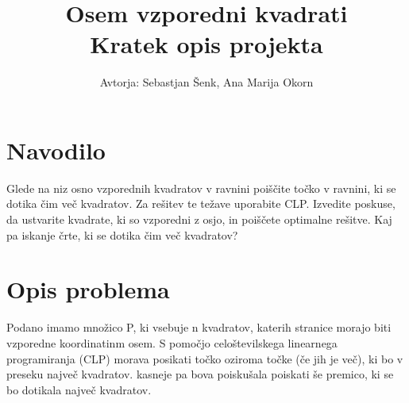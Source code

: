 \documentclass[a4, 12pt]{article}
\begin{document}
\title{ Osem vzporedni kvadrati  \\
  \large Kratek opis projekta}

\author{Avtorja: Sebastjan Šenk, Ana Marija Okorn}

\maketitle

\section{Navodilo}

Glede na niz osno vzporednih kvadratov v ravnini poiščite točko v ravnini, ki se dotika čim več kvadratov. Za rešitev te težave uporabite CLP. Izvedite poskuse, da ustvarite kvadrate, ki so vzporedni z osjo, in poiščete optimalne rešitve. Kaj pa iskanje črte, ki se dotika čim več kvadratov? 

\section{Opis problema}

Podano imamo množico P, ki vsebuje n kvadratov, katerih stranice morajo biti vzporedne koordinatinm osem. S pomočjo celoštevilskega linearnega programiranja (CLP) morava posikati točko oziroma točke (če jih je več), ki bo v preseku največ kvadratov. kasneje pa bova poiskušala poiskati še premico, ki se bo dotikala največ kvadratov.
\end{document}
